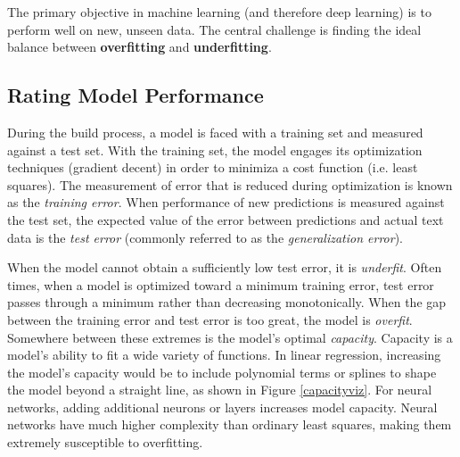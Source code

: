 The primary objective in machine learning (and therefore deep learning) is to perform well on new, unseen data.  The central challenge is finding the ideal balance between \textbf{overfitting} and \textbf{underfitting}.

\subsection{Rating Model Performance}


During the build process, a model is faced with a training set and measured against a test set.  With the training set, the model engages its optimization techniques (gradient decent) in order to minimiza a cost function (i.e. least squares).  The measurement of error that is reduced during optimization is known as the \textit{training error}.  When performance of new predictions is measured against the test set, the expected value of the error between predictions and actual text data is the \textit{test error} (commonly referred to as the \textit{generalization error}). \cite{Goodfellow-et-al-2016}

 When the model cannot obtain a sufficiently low test error, it is \textit{underfit}.  Often times, when a model is optimized toward a minimum training error, test error passes through a minimum rather than decreasing monotonically. \cite{mackay1992bayesian}  When the gap between the training error and test error is too great, the model is \textit{overfit}.  Somewhere between these extremes is the model's optimal \textit{capacity}.  Capacity is a model's ability to fit a wide variety of functions.  In linear regression, increasing the model's capacity would be to include polynomial terms or splines to shape the model beyond a straight line, as shown in Figure \ref{capacityviz}.  For neural networks, adding additional neurons or layers increases model capacity. 
 Neural networks have much higher complexity than ordinary least squares, making them extremely susceptible to overfitting.



